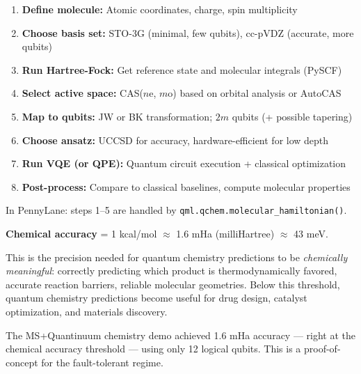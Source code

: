 \documentclass[11pt,a4paper]{article}
\begin{document}
\begin{answerbox}
\begin{enumerate}
    \item \textbf{Define molecule:} Atomic coordinates, charge, spin multiplicity
    \item \textbf{Choose basis set:} STO-3G (minimal, few qubits), cc-pVDZ (accurate, more qubits)
    \item \textbf{Run Hartree-Fock:} Get reference state and molecular integrals (PySCF)
    \item \textbf{Select active space:} CAS($n$e, $m$o) based on orbital analysis or AutoCAS
    \item \textbf{Map to qubits:} JW or BK transformation; $2m$ qubits (+ possible tapering)
    \item \textbf{Choose ansatz:} UCCSD for accuracy, hardware-efficient for low depth
    \item \textbf{Run VQE (or QPE):} Quantum circuit execution + classical optimization
    \item \textbf{Post-process:} Compare to classical baselines, compute molecular properties
\end{enumerate}
In PennyLane: steps 1--5 are handled by \texttt{qml.qchem.molecular\_hamiltonian()}.
\end{answerbox}

\begin{answerbox}
\textbf{Chemical accuracy} = 1 kcal/mol $\approx$ 1.6 mHa (milliHartree) $\approx$ 43 meV.

This is the precision needed for quantum chemistry predictions to be \emph{chemically meaningful}: correctly predicting which product is thermodynamically favored, accurate reaction barriers, reliable molecular geometries. Below this threshold, quantum chemistry predictions become useful for drug design, catalyst optimization, and materials discovery.

The MS+Quantinuum chemistry demo achieved 1.6 mHa accuracy --- right at the chemical accuracy threshold --- using only 12 logical qubits. This is a proof-of-concept for the fault-tolerant regime.
\end{answerbox}
\end{document}

